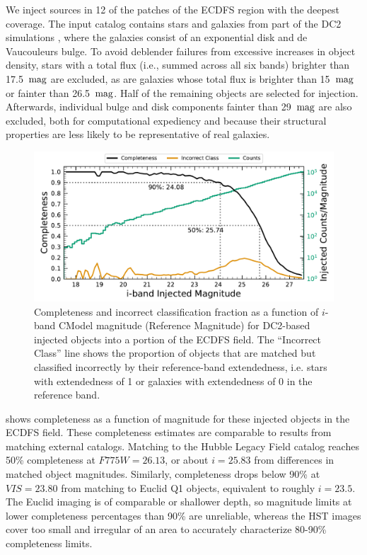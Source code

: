 We inject sources in 12 of the patches of the \gls{ECDFS} region with the deepest coverage.
The input catalog contains stars and galaxies from part of the \gls{DC2} simulations \citep{2021ApJS..253...31L}, where the galaxies consist of an exponential disk and de Vaucouleurs \citep{1948AnAp...11..247D,1953MNRAS.113..134D} bulge.
To avoid deblender failures from excessive increases in object density, stars with a total \gls{flux} (i.e., summed across all six bands) brighter than 17.5~${\rm mag}$ are excluded, as are galaxies whose total \gls{flux} is brighter than 15~${\rm mag}$ or fainter than 26.5~${\rm mag}$.
Half of the remaining objects are selected for injection.
Afterwards, individual bulge and disk components fainter than 29~${\rm mag}$ are also excluded, both for computational expediency and because their structural properties are less likely to be representative of real galaxies.
\begin{figure}[htb]
\includegraphics[width=\linewidth]{injected_lsst_cells_v1_5063_i_completeness_any}
\caption{Completeness and incorrect classification fraction as a function of $i$-band CModel magnitude (Reference Magnitude) for DC2-based injected objects into a portion of the ECDFS field. 
The ``Incorrect Class'' line shows the proportion of objects that are matched but classified incorrectly by their reference-band extendedness, i.e. stars with extendedness of 1 or galaxies with extendedness of 0 in the reference band.}
\label{fig:injected_lsst_cells_v1_5063_i_completeness_any}
\end{figure}

 shows completeness as a function of magnitude for these injected objects in the \gls{ECDFS} field.
These completeness estimates are comparable to results from matching external catalogs. 
Matching to the Hubble Legacy Field catalog \citep{2016arXiv160600841I, 2019ApJS..244...16W} reaches 50\% completeness at $F775W=26.13$, or about $i=25.83$ from differences in matched object magnitudes.
Similarly, completeness drops below 90\% at $VIS=23.80$ from matching to Euclid Q1 \citep{2025arXiv250315305E} objects, equivalent to roughly $i=23.5$. 
The Euclid imaging is of comparable or shallower depth, so magnitude limits at lower completeness percentages than 90\% are unreliable, whereas the HST images cover too small and irregular of an area to accurately characterize 80-90\% completeness limits.

